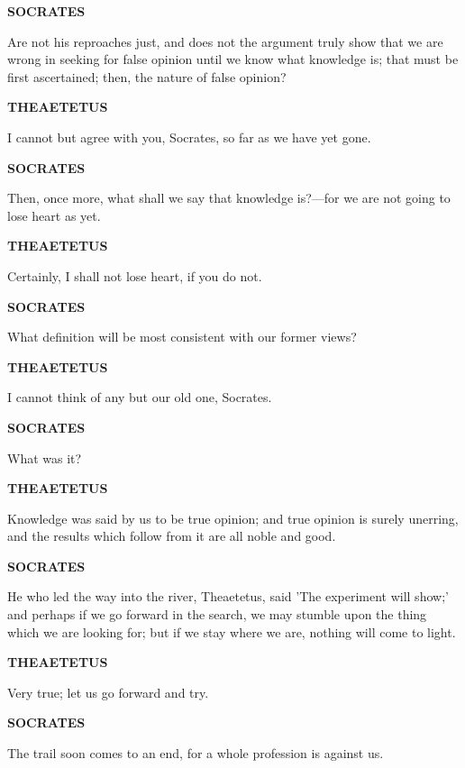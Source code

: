 \documentclass[11pt,letter]{article}
\begin{document}
\par \textbf{SOCRATES}
\par   Are not his reproaches just, and does not the argument truly show that we are wrong in seeking for false opinion until we know what knowledge is; that must be first ascertained; then, the nature of false opinion?

\par \textbf{THEAETETUS}
\par   I cannot but agree with you, Socrates, so far as we have yet gone.

\par \textbf{SOCRATES}
\par   Then, once more, what shall we say that knowledge is?—for we are not going to lose heart as yet.

\par \textbf{THEAETETUS}
\par   Certainly, I shall not lose heart, if you do not.

\par \textbf{SOCRATES}
\par   What definition will be most consistent with our former views?

\par \textbf{THEAETETUS}
\par   I cannot think of any but our old one, Socrates.

\par \textbf{SOCRATES}
\par   What was it?

\par \textbf{THEAETETUS}
\par   Knowledge was said by us to be true opinion; and true opinion is surely unerring, and the results which follow from it are all noble and good.

\par \textbf{SOCRATES}
\par   He who led the way into the river, Theaetetus, said 'The experiment will show;' and perhaps if we go forward in the search, we may stumble upon the thing which we are looking for; but if we stay where we are, nothing will come to light.

\par \textbf{THEAETETUS}
\par   Very true; let us go forward and try.

\par \textbf{SOCRATES}
\par   The trail soon comes to an end, for a whole profession is against us.
\end{document}
